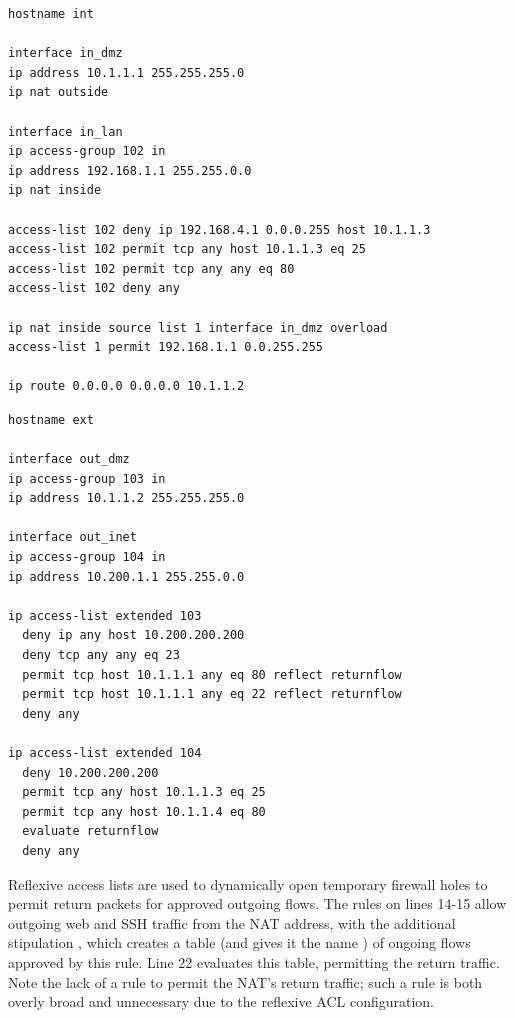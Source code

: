\noindent\begin{minipage}{\linewidth}
\begin{lstlisting}[float=t,label=lst:initial-example-int,language=IOS,caption=Example IOS Configuration (1)]
hostname int

interface in_dmz
ip address 10.1.1.1 255.255.255.0
ip nat outside

interface in_lan
ip access-group 102 in
ip address 192.168.1.1 255.255.0.0
ip nat inside

access-list 102 deny ip 192.168.4.1 0.0.0.255 host 10.1.1.3
access-list 102 permit tcp any host 10.1.1.3 eq 25
access-list 102 permit tcp any any eq 80
access-list 102 deny any

ip nat inside source list 1 interface in_dmz overload
access-list 1 permit 192.168.1.1 0.0.255.255

ip route 0.0.0.0 0.0.0.0 10.1.1.2
\end{lstlisting}
\end{minipage}

\noindent\begin{minipage}{\linewidth}
\begin{lstlisting}[float=t,label=lst:initial-example-ext,language=IOS,caption=Example IOS Configuration (2)]
hostname ext

interface out_dmz
ip access-group 103 in
ip address 10.1.1.2 255.255.255.0

interface out_inet
ip access-group 104 in
ip address 10.200.1.1 255.255.0.0

ip access-list extended 103
  deny ip any host 10.200.200.200
  deny tcp any any eq 23
  permit tcp host 10.1.1.1 any eq 80 reflect returnflow
  permit tcp host 10.1.1.1 any eq 22 reflect returnflow
  deny any

ip access-list extended 104
  deny 10.200.200.200
  permit tcp any host 10.1.1.3 eq 25
  permit tcp any host 10.1.1.4 eq 80
  evaluate returnflow
  deny any
\end{lstlisting}
\end{minipage}

Reflexive access lists are used to dynamically open temporary
firewall holes to permit return packets for approved outgoing flows.
The rules on lines 14-15 allow outgoing
web and SSH traffic from the NAT address, with the additional stipulation ,
which creates a table (and gives it the name ) of ongoing
flows approved by this rule. Line 22 evaluates this table, permitting the return
traffic. Note the lack of a  rule to permit the NAT's return traffic; such a
rule is both overly broad and unnecessary due to the reflexive ACL configuration.


